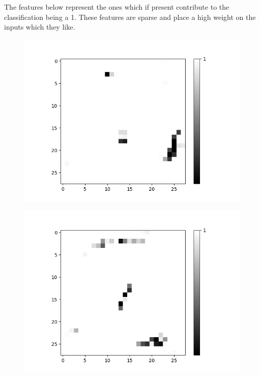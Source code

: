 The features below represent the ones which if present contribute to the classification being a 1. These features are sparse and place a high weight on the inputs which they like.

\begin{figure}[H]
	\captionsetup{labelformat=empty}
	\centering
	\begin{minipage}[b]{0.19\textwidth}
		\includegraphics[width=\textwidth]{OR-AND(WO-LSM)(1)/Like/True/Layer0-Neuron-0.png}
		\label{}
	\end{minipage}
	\begin{minipage}[b]{0.19\textwidth}
		\includegraphics[width=\textwidth]{OR-AND(WO-LSM)(1)/Like/True/Layer0-Neuron-3.png}

\end{minipage}
\end{figure}

